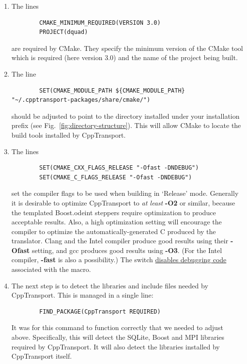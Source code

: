 \documentclass[11pt,a4paper]{article}
\renewcommand{\texttt}[1]{{\ttfamily\fontseries{l}\selectfont{#1}}}
\newcommand{\packagefont}{\sffamily}
\newcommand{\CppTransport}{{\packagefont CppTransport}}
\newcommand{\MPI}{{\packagefont MPI}}
\newcommand{\SQLite}{{\packagefont SQLite}}
\newcommand{\Boost}{{\packagefont Boost}}
\newcommand{\odeint}{{\packagefont odeint}}
\newcommand{\CMake}{{\packagefont CMake}}
\newcommand{\file}[1]{\texttt{{#1}}}
\newcommand{\cmakevar}[1]{\texttt{\textbf{\footnotesize #1}}}
\newcommand{\option}[1]{{\ttfamily\bfseries\small #1}}
\newcommand\CC{C\nolinebreak\hspace{-.05em}\raisebox{.4ex}{\relsize{-3}{\textbf{+}}}\nolinebreak\hspace{-.10em}\raisebox{.4ex}{\relsize{-3}{\textbf{+}}}}
\begin{document}
\begin{enumerate}
    \item The lines
    \begin{verbatim}
        CMAKE_MINIMUM_REQUIRED(VERSION 3.0)
        PROJECT(dquad)
    \end{verbatim}
    are required by {\CMake}.
    They specify the minimum version of the {\CMake} tool which is required
    (here version 3.0) and the name of the project being built.
    
    \item The line
    \begin{verbatim}
        SET(CMAKE_MODULE_PATH ${CMAKE_MODULE_PATH} "~/.cpptransport-packages/share/cmake/")
    \end{verbatim}
    should be adjusted to point to the \file{share/cmake} directory
    installed under your installation prefix
    (see Fig.~\ref{fig:directory-structure}).
    This will allow {\CMake} to locate the build tools installed by
    {\CppTransport}.
    
    \item The lines
    \begin{verbatim}
        SET(CMAKE_CXX_FLAGS_RELEASE "-Ofast -DNDEBUG")
        SET(CMAKE_C_FLAGS_RELEASE "-Ofast -DNDEBUG")
    \end{verbatim}
    set the compiler flags to be used when building in `Release' mode.
    Generally it is desirable to optimize {\CppTransport} to \emph{at least}
    \option{-O2} or similar, because the
    templated {\Boost}.{\odeint} steppers require optimization to produce
    acceptable results.
    Also, a high optimization setting will encourage the compiler
    to optimize the automatically-generated {\CC} produced by the translator.
    Clang and the Intel compiler produce good results using their
    \option{-Ofast} setting,
    and gcc produces good results using \option{-O3}.
    (For the Intel compiler, \option{-fast} is also a possibility.)
    The switch \texttt{-DNDEBUG}
    \href{http://en.cppreference.com/w/cpp/error/assert}{disables debugging code}
    associated with the
    \texttt{assert()} macro.
    
    \item
    The next step is to detect the libraries and include files needed by
    {\CppTransport}. This is managed in a single line:
    \begin{verbatim}
        FIND_PACKAGE(CppTransport REQUIRED)
    \end{verbatim}
    It was for this command to function correctly that we needed to
    adjust \cmakevar{CMAKE\_MODULE\_PATH} above.
    Specifically, this will detect the {\SQLite}, {\Boost} and {\MPI}
    libraries required by {\CppTransport}. It will also detect the
    libraries installed by {\CppTransport} itself.
    

\end{enumerate}
\end{document}
